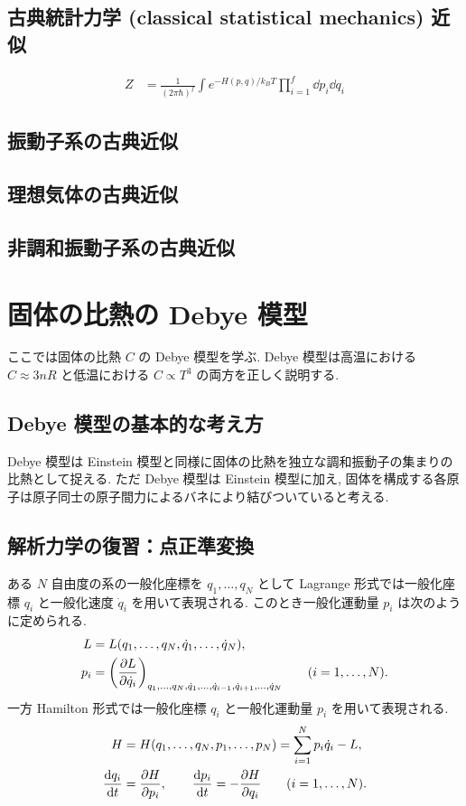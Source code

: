 \documentclass[uplatex,dvipdfmx,a4paper,11pt]{jlreq}
\theoremstyle{definition}
\begin{document}
\subsection{古典統計力学 (classical statistical mechanics) 近似}

\begin{theorem}
  \begin{align}
    Z & = \frac{1}{(2\pi\hbar)^f}\int e^{-H(p, q)/k_BT}\prod_{i=1}^{f}\dd{p_i}\dd{q_i}
  \end{align}
\end{theorem}

\subsection{振動子系の古典近似}
\subsection{理想気体の古典近似}
\subsection{非調和振動子系の古典近似}

\section{固体の比熱の Debye 模型}
ここでは固体の比熱 $C$ の Debye 模型を学ぶ. Debye 模型は高温における $C\approx 3nR$ と低温における $C\propto T^3$ の両方を正しく説明する.
\subsection{Debye 模型の基本的な考え方}
Debye 模型は Einstein 模型と同様に固体の比熱を独立な調和振動子の集まりの比熱として捉える. ただ Debye 模型は Einstein 模型に加え, 固体を構成する各原子は原子同士の原子間力によるバネにより結びついていると考える.

\subsection{解析力学の復習：点正準変換}
ある $N$ 自由度の系の一般化座標を $q_1, \ldots, q_N$ として Lagrange 形式では一般化座標 $q_i$ と一般化速度 $\dot{q}_i$ を用いて表現される. このとき一般化運動量 $p_i$ は次のように定められる.
\begin{align}
  L   & = L(q_1,\ldots,q_N,\dot{q}_1,\ldots,\dot{q}_N),                                                                                    \\
  p_i & = \qty(\pdv{L}{\dot{q}_i})_{q_1,\ldots,q_N,\dot{q}_1,\ldots,\dot{q}_{i-1},\dot{q}_{i+1},\ldots,\dot{q}_N} \qquad (i = 1,\ldots,N).
\end{align}
一方 Hamilton 形式では一般化座標 $q_i$ と一般化運動量 $p_i$ を用いて表現される.
\begin{align}
  H           & = H(q_1,\ldots,q_N,p_1,\ldots,p_N) = \sum_{i=1}^{N}p_i\dot{q}_i - L,        \\
  \dv{q_i}{t} & = \pdv{H}{p_i}, \qquad \dv{p_i}{t} = -\pdv{H}{q_i} \qquad (i = 1,\ldots,N).
\end{align}
\end{document}
